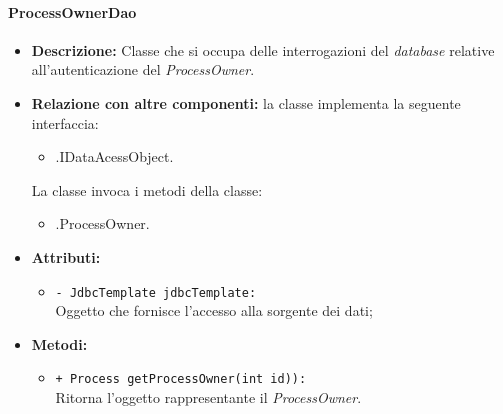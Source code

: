 \paragraph{ProcessOwnerDao}
\label{processownerdao}
\begin{flushleft}
\begin{itemize}
\item \textbf{Descrizione:} Classe che si occupa delle interrogazioni del \textit{database} relative all'autenticazione del \textit{ProcessOwner}.
\item \textbf{Relazione con altre componenti:} la classe implementa la seguente interfaccia:
		\begin{itemize}
			\item \smodel{}.IDataAcessObject.
		\end{itemize}
		La classe invoca i metodi della classe:
		\begin{itemize}
			\item \smodel{}.ProcessOwner.
		\end{itemize}
\item \textbf{Attributi:}
\begin{sloppypar}
\begin{itemize}
\item \texttt{- JdbcTemplate jdbcTemplate:}\\ Oggetto che fornisce l'accesso alla sorgente dei dati;
\end{itemize}
\end{sloppypar}
\item \textbf{Metodi:}
\begin{sloppypar}
\begin{itemize}
\item \texttt{+ Process getProcessOwner(int id)):}\\ Ritorna l'oggetto rappresentante il \textit{ProcessOwner}. 
\end{itemize}
\end{sloppypar}
\end{itemize}
\end{flushleft}

